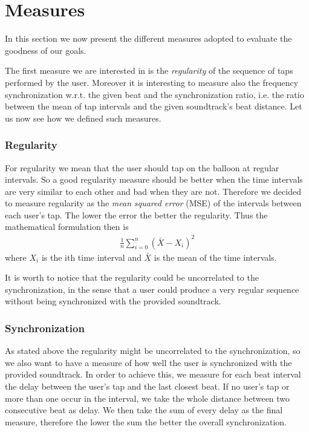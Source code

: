 \section{Measures}
\label{sec:measures}
In this section we now present the different measures adopted to evaluate the goodness of our goals.

The first measure we are interested in is the \emph{regularity} of the sequence of taps performed by the user. Moreover it is interesting to measure also the frequency synchronization w.r.t. the given beat and the synchronization ratio, i.e. the ratio between the mean of tap intervals and the given soundtrack's beat distance.
Let us now see how we defined such measures.
\subsubsection{Regularity}
For regularity we mean that the user should tap on the balloon at regular intervals. So a good regularity measure should be better when the time intervals are very similar to each other and bad when they are not. Therefore we decided to measure regularity as the \emph{mean squared error} (MSE) of the intervals between each user's tap.
The lower the error the better the regularity.
Thus the mathematical formulation then is
\begin{align}
	\frac{1}{n}\displaystyle\sum\limits_{i=0}^n(\bar{X}-X_i)^2
\end{align}
where $X_i$ is the ith time interval and $\bar{X}$ is the mean of the time intervals.

It is worth to notice that the regularity could be uncorrelated to the synchronization, in the sense that a user could produce a very regular sequence without being synchronized with the provided soundtrack.

\subsubsection{Synchronization}
As stated above the regularity might be uncorrelated to the synchronization, so we also want to have a measure of how well the user is synchronized with the provided soundtrack.
In order to achieve this, we measure for each beat interval the delay between the user's tap and the last closest beat.
If no user's tap or more than one occur in the interval, we take the whole distance between two consecutive beat as delay.
We then take the sum of every delay as the final measure, therefore the lower the sum the better the overall synchronization.

